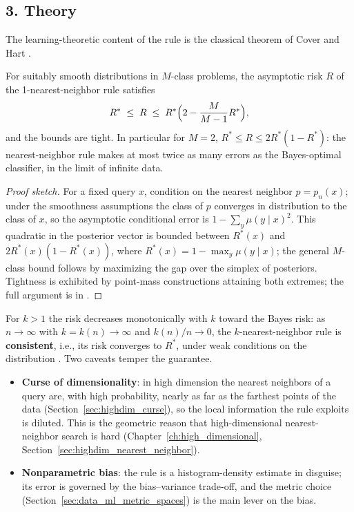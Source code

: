 \subsection{3. Theory}

The learning-theoretic content of the rule is the classical theorem of Cover
and Hart \cite{cover1967}.

\begin{theorem}\label{thm:data_ml_cover_hart}
  For suitably smooth distributions in $M$-class problems, the asymptotic
  risk $R$ of the 1-nearest-neighbor rule satisfies
  \[
    R^* \;\leq\; R \;\leq\; R^* \Bigl(2 - \frac{M}{M-1} R^*\Bigr),
  \]
  and the bounds are tight. In particular for $M = 2$,
  $R^* \leq R \leq 2 R^* (1 - R^*)$: the nearest-neighbor rule makes at most
  twice as many errors as the Bayes-optimal classifier, in the limit of
  infinite data.
\end{theorem}

\begin{proof}[Proof sketch]
  For a fixed query $x$, condition on the nearest neighbor
  $p = p_n(x)$; under the smoothness assumptions the class of $p$ converges
  in distribution to the class of $x$, so the asymptotic conditional error
  is $1 - \sum_{y} \mu(y \mid x)^2$. This quadratic in the posterior vector
  is bounded between $R^*(x)$ and $2 R^*(x)(1 - R^*(x))$, where
  $R^*(x) = 1 - \max_y \mu(y \mid x)$; the general $M$-class bound follows
  by maximizing the gap over the simplex of posteriors. Tightness is
  exhibited by point-mass constructions attaining both extremes; the full
  argument is in \cite{cover1967}.
\end{proof}

For $k > 1$ the risk decreases monotonically with $k$ toward the Bayes risk:
as $n \to \infty$ with $k = k(n) \to \infty$ and $k(n)/n \to 0$, the
$k$-nearest-neighbor rule is \textbf{consistent}, i.e.,
its risk converges to $R^*$, under weak conditions on the distribution
\cite{duda2001,bishop2006}. Two caveats temper the guarantee.
\begin{itemize}
\item \textbf{Curse of dimensionality}: in high dimension the nearest
  neighbors of a query are, with high probability, nearly as far as the
  farthest points of the data (Section~\ref{sec:highdim_curse}), so the
  local information the rule exploits is diluted. This is the geometric
  reason that high-dimensional nearest-neighbor search is hard
  (Chapter~\ref{ch:high_dimensional}, Section~\ref{sec:highdim_nearest_neighbor}).
\item \textbf{Nonparametric bias}: the rule is a histogram-density
  estimate in disguise; its error is governed by the bias--variance
  trade-off, and the metric choice (Section~\ref{sec:data_ml_metric_spaces})
  is the main lever on the bias.
\end{itemize}

